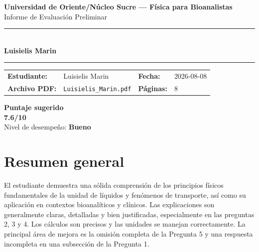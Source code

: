 \documentclass[11pt,a4paper]{article}
\begin{document}
\begin{center}
  {\Large\bfseries\color{azulTitulo} Universidad de Oriente/Núcleo Sucre --- Física para Bioanalistas}\\[4pt]
  {\large Informe de Evaluación Preliminar}\\[12pt]
  \rule{\linewidth}{1.2pt}\\[6pt]
  {\LARGE\bfseries Luisielis Marin}\\[4pt]
  \rule{\linewidth}{0.6pt}
\end{center}

\vspace{4pt}
\begin{tcolorbox}[cajaTitulo, title=Datos del informe]
\begin{tabular}{@{}llll@{}}
  \textbf{Estudiante:}  & Luisielis Marin  &
  \textbf{Fecha:}       & 2026-08-08 \\[4pt]
  \textbf{Archivo PDF:} & \texttt{Luisielis\_Marin.pdf}  &
  \textbf{Páginas:}     & 8 \\
\end{tabular}
\end{tcolorbox}

\vspace{6pt}
\begin{center}
  \begin{tcolorbox}[
    enhanced,
    colback=white, colframe=desempeno_bueno,
    width=0.62\linewidth,
    boxrule=2pt,
    halign=center, valign=center,
    top=8pt, bottom=8pt,
  ]
    \centering
    {\large\bfseries Puntaje sugerido}\\[6pt]
    {\Huge\bfseries\color{desempeno_bueno} 7.6/10}\\[6pt]
    {\large Nivel de desempeño: \textbf{\color{desempeno_bueno} Bueno}}
  \end{tcolorbox}
\end{center}

\section*{Resumen general}
El estudiante demuestra una sólida comprensión de los principios físicos fundamentales de la unidad de líquidos y fenómenos de transporte, así como su aplicación en contextos bioanalíticos y clínicos. Las explicaciones son generalmente claras, detalladas y bien justificadas, especialmente en las preguntas 2, 3 y 4. Los cálculos son precisos y las unidades se manejan correctamente. La principal área de mejora es la omisión completa de la Pregunta 5 y una respuesta incompleta en una subsección de la Pregunta 1.
\end{document}
